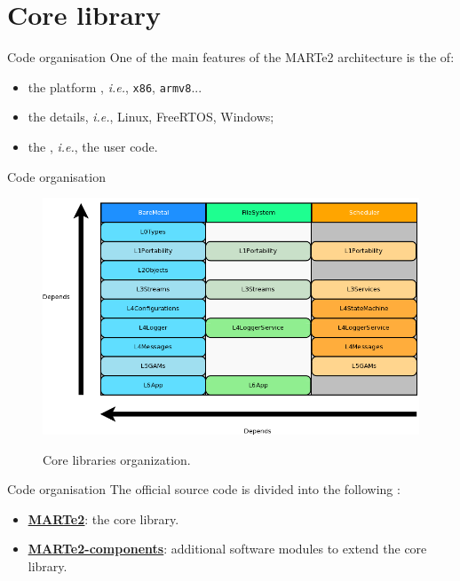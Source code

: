 
\section{Core library}
\graphicspath{{figs/section2/}}

\begin{frame}{Code organisation}
	One of the main features of the MARTe2 architecture is the  of:
	\begin{itemize}
		\item the platform , \emph{i.e.}, \texttt{x86}, \texttt{armv8}...
		\item the  details, \emph{i.e.}, Linux, FreeRTOS, Windows;
		\item the , \emph{i.e.}, the user code.
	\end{itemize}
\end{frame}
\begin{frame}{Code organisation}
	\begin{figure}
		\centering
		\includegraphics[scale=.35]{Tiers.png}
		\label{fig:tiers}
		\caption{Core libraries organization.}
	\end{figure}
\end{frame}
\begin{frame}{Code organisation}
	The official source code is divided into the following :
  \begin{itemize}
    \item \href{https://vcis-gitlab.f4e.europa.eu/aneto/MARTe2}{\color{blue}\underline{\textbf{MARTe2}}}: the core library.
    \item \href{https://vcis-gitlab.f4e.europa.eu/aneto/MARTe2-components}{\color{blue}\underline{\textbf{MARTe2-components}}}: additional software modules to extend the core library.
  \end{itemize}
\end{frame}

